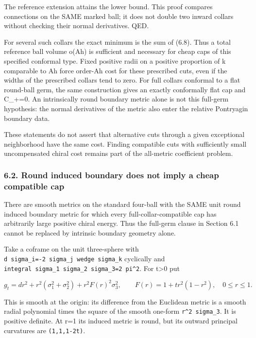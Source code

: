 \documentclass[
  10pt,
]{article}
\begin{document}
The reference extension attains the lower bound. This proof compares
connections on the SAME marked ball; it does not double two inward
collars without checking their normal derivatives. QED.

For several such collars the exact minimum is the sum of (6.8). Thus a
total reference ball volume o(Ah) is sufficient and necessary for cheap
caps of this specified conformal type. Fixed positive radii on a
positive proportion of k comparable to Ah force order-Ah cost for these
prescribed cuts, even if the widths of the prescribed collars tend to
zero. For full collars conformal to a flat round-ball germ, the same
construction gives an exactly conformally flat cap and C\_+=0. An
intrinsically round boundary metric alone is not this full-germ
hypothesis: the normal derivatives of the metric also enter the relative
Pontryagin boundary data.

These statements do not assert that alternative cuts through a given
exceptional neighborhood have the same cost. Finding compatible cuts
with sufficiently small uncompensated chiral cost remains part of the
all-metric coefficient problem.

\hypertarget{round-induced-boundary-does-not-imply-a-cheap-compatible-cap}{%
\subsubsection{6.2. Round induced boundary does not imply a cheap
compatible
cap}\label{round-induced-boundary-does-not-imply-a-cheap-compatible-cap}}

There are smooth metrics on the standard four-ball with the SAME unit
round induced boundary metric for which every full-collar-compatible cap
has arbitrarily large positive chiral energy. Thus the full-germ clause
in Section 6.1 cannot be replaced by intrinsic boundary geometry alone.

Take a coframe on the unit three-sphere with
\texttt{d\ sigma\_i=-2\ sigma\_j\ wedge\ sigma\_k} cyclically and
\texttt{integral\ sigma\_1\ sigma\_2\ sigma\_3=2\ pi\^{}2}. For
t\textgreater0 put

\[
 g_t=dr^2+r^2(\sigma_1^2+\sigma_2^2)
        +r^2F(r)^2\sigma_3^2,
 \qquad F(r)=1+t r^2(1-r^2),\quad 0\le r\le1.       \tag{6.10}
\]

This is smooth at the origin: its difference from the Euclidean metric
is a smooth radial polynomial times the square of the smooth one-form
\texttt{r\^{}2\ sigma\_3}. It is positive definite. At r=1 its induced
metric is round, but its outward principal curvatures are
\texttt{(1,1,1-2t)}.
\end{document}
